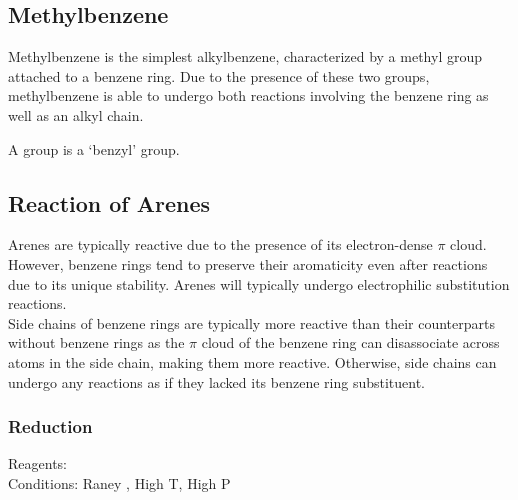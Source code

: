 \documentclass[../main]{subfiles}
\begin{document}
	\begin{center}
	\end{center}

	\subsection{Methylbenzene}

	Methylbenzene is the simplest alkylbenzene, characterized by a methyl group attached to a benzene ring. Due to the presence of these two groups, methylbenzene is able to undergo both reactions involving the benzene ring as well as an alkyl chain. \\

	\begin{center}
	\end{center}

	A  group is a `benzyl' group. \\

	\begin{center}
	\end{center}

	\subsection{Reaction of Arenes}

	Arenes are typically reactive due to the presence of its electron-dense \(\pi\)  cloud. However, benzene rings tend to preserve their aromaticity even after reactions due to its unique stability. Arenes will typically undergo electrophilic substitution reactions. \\

	Side chains of benzene rings are typically more reactive than their counterparts without benzene rings as the \(\pi\)  cloud of the benzene ring can disassociate across  atoms in the side chain, making them more reactive. Otherwise, side chains can undergo any reactions as if they lacked its benzene ring substituent.

	\subsubsection{Reduction}

	Reagents: \\
	Conditions: Raney , High T,  High P \\
\end{document}
